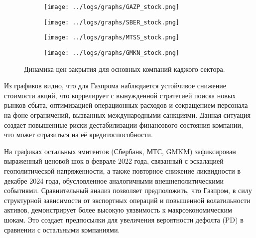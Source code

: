 \documentclass[]{article}
\begin{document}
	\begin{figure}[ht]
		\centering
		\begin{subfigure}[b]{0.48\textwidth} %
			\texttt{[image: ../logs/graphs/GAZP\_stock.png]}
			\label{fig:img1}
		\end{subfigure}
		\hfill %
		\begin{subfigure}[b]{0.48\textwidth}
			\texttt{[image: ../logs/graphs/SBER\_stock.png]}
			\label{fig:img2}
		\end{subfigure}
		
		\vspace{0.5cm} %
		
		\begin{subfigure}[b]{0.48\textwidth}
			\texttt{[image: ../logs/graphs/MTSS\_stock.png]}
			\label{fig:img3}
		\end{subfigure}
		\hfill
		\begin{subfigure}[b]{0.48\textwidth}
			\texttt{[image: ../logs/graphs/GMKN\_stock.png]}
			\label{fig:img4}
		\end{subfigure}
		\caption{Динамика цен закрытия для основных компаний каджого сектора.}
		\label{fig:stocks}
	\end{figure}
	
	Из графиков видно, что для Газпрома наблюдается устойчивое снижение стоимости акций, что коррелирует с вынужденной стратегией поиска новых рынков сбыта, оптимизацией операционных расходов и сокращением персонала на фоне ограничений, вызванных международными санкциями. Данная ситуация создает повышенные риски дестабилизации финансового состояния компании, что может отразиться на её кредитоспособности.  
	
	На графиках остальных эмитентов (Сбербанк, МТС, GMKM) зафиксирован выраженный ценовой шок в феврале 2022 года, связанный с эскалацией геополитической напряженности, а также повторное снижение ликвидности в декабре 2024 года, обусловленное аналогичными внешнеполитическими событиями. Сравнительный анализ позволяет предположить, что Газпром, в силу структурной зависимости от экспортных операций и повышенной волатильности активов, демонстрирует более высокую уязвимость к макроэкономическим шокам. Это создает предпосылки для увеличения вероятности дефолта (PD) в сравнении с остальными компаниями.  
	
\end{document}
